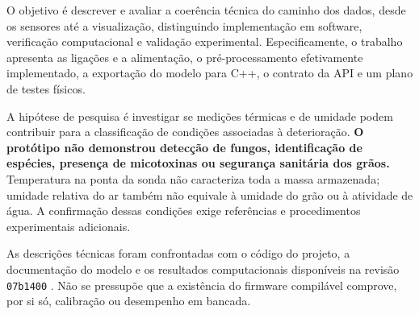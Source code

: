 O objetivo é descrever e avaliar a coerência técnica do caminho dos dados,
desde os sensores até a visualização, distinguindo implementação em software,
verificação computacional e validação experimental. Especificamente, o
trabalho apresenta as ligações e a alimentação, o pré-processamento
efetivamente implementado, a exportação do modelo para C++, o contrato da API
e um plano de testes físicos.

A hipótese de pesquisa é investigar se medições térmicas e de umidade podem
contribuir para a classificação de condições associadas à deterioração.
\textbf{O protótipo não demonstrou detecção de fungos, identificação de
espécies, presença de micotoxinas ou segurança sanitária dos grãos.}
Temperatura na ponta da sonda não caracteriza toda a massa armazenada;
umidade relativa do ar também não equivale à umidade do grão ou à atividade
de água. A confirmação dessas condições exige referências e procedimentos
experimentais adicionais.

As descrições técnicas foram confrontadas com o código do projeto, a
documentação do modelo e os resultados computacionais disponíveis na revisão
\texttt{07b1400} \cite{msmonitor2026}. Não se pressupõe que a existência do
firmware compilável comprove, por si só, calibração ou desempenho em bancada.
